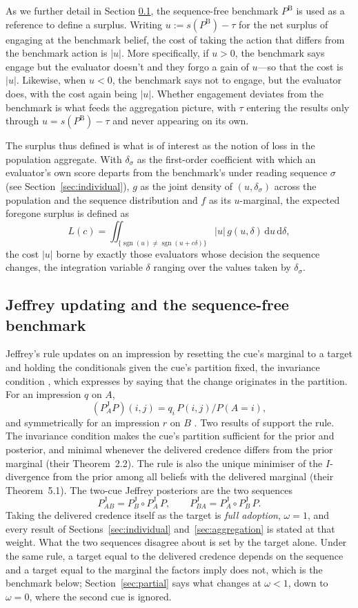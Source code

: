 \documentclass[a4paper,fleqn]{cas-sc}
\theoremstyle{remark}
\theoremstyle{definition}
\newcommand{\PB}{P^{\mathrm{B}}}
\newcommand{\PJ}{P^{\mathrm{J}}}
\newcommand{\sgn}{\operatorname{sgn}}
\newcommand{\anchor}[1]{}
\begin{document}
As we further detail in Section \ref{sec:jeffrey}, the sequence-free benchmark $\PB$ is used as a reference \citep{Wagner2002} to define a surplus. Writing $u:=s(\PB)-\tau$ for the net surplus of engaging at the benchmark belief, the cost of taking the action that differs from the benchmark action is $|u|$. More specifically, if $u>0$, the benchmark says engage but the evaluator doesn't and they forgo a gain of $u$---so that the cost is $|u|$. Likewise, when $u<0$, the benchmark says not to engage, but the evaluator does, with the cost again being $|u|$. Whether engagement deviates from the benchmark is what feeds the aggregation picture, with
$\tau$ entering the results only through $u=s(\PB)-\tau$ and never appearing on its own.

The surplus thus defined is what is of interest as the notion of loss in the population aggregate. With $\delta_\sigma$ as the first-order coefficient with which an evaluator's own score departs from the benchmark's under reading sequence $\sigma$ (see Section~\ref{sec:individual}), $g$ as the joint density of $(u,\delta_\sigma)$ across the population and the sequence distribution and $f$ as its $u$-marginal, the expected foregone surplus is defined as 
\[
  L(c)=\iint_{\{\sgn(u)\neq\sgn(u+c\delta)\}}|u|\,g(u,\delta)\,\mathrm{d}u\,\mathrm{d}\delta,
\]
the cost $|u|$ borne by exactly those evaluators whose decision the sequence changes, the integration variable $\delta$ ranging over the values taken by $\delta_\sigma$.

\subsection{Jeffrey updating and the sequence-free benchmark}
\label{sec:jeffrey}

Jeffrey's rule updates on an impression by resetting the cue's marginal to a target and holding the conditionals given the cue's partition fixed, the invariance
condition \citep[ch.~3]{Jeffrey2004}, which \citet[ch.~11]{Jeffrey1983} expresses by
saying that the change originates in the partition. For an impression $q$ on $A$,
\[
  (\PJ_{A}P)(i,j)=q_{i}\,P(i,j)/P(A{=}i),
\]
and symmetrically for an impression $r$ on $B$ \anchor{Setup}. Two results of \citet{DiaconisZabell1982} support the rule. The invariance
condition makes the cue's partition sufficient for the prior and posterior, and
minimal whenever the delivered credence differs from the prior marginal (their
Theorem~2.2). The rule is also the unique minimiser of the $I$-divergence from the
prior among all beliefs with the delivered marginal (their Theorem~5.1). The
two-cue Jeffrey posteriors are the two sequences
\[
  \PJ_{AB}=\PJ_{B}\!\circ\PJ_{A}\,P,\qquad \PJ_{BA}=\PJ_{A}\!\circ\PJ_{B}\,P .
\]
Taking the delivered credence itself as the target is \emph{full adoption}, $\omega=1$, and
every result of Sections~\ref{sec:individual} and~\ref{sec:aggregation} is stated at
that weight. What the two sequences disagree about is set by the target alone. Under the same rule, a target equal to the delivered credence depends on the sequence and a target equal to the marginal the factors imply does not, which is the benchmark below; Section~\ref{sec:partial} says what changes at $\omega<1$, down to
$\omega=0$, where the second cue is ignored.
\end{document}
